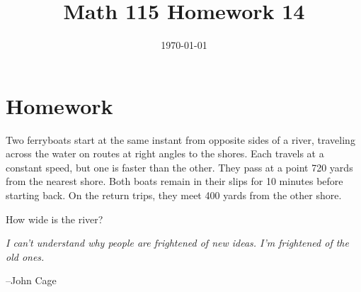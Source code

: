 \documentclass[fleqn,addpoints]{exam}
\title{Math 115 Homework 14}
\date{\today}
\begin{document}
\maketitle

\section{Homework}

\begin{questions}
\question
Two ferryboats start at the same instant from opposite sides of a river, traveling across the water on routes at right
angles to the shores.  Each travels at a constant speed, but one is faster than the other.  They pass at a point 720
yards from the nearest shore.  Both boats remain in their slips for 10 minutes before starting back.  On the return
trips, they meet 400 yards from the other shore.

How wide is the river?

\end{questions}

\ifprintanswers
\else

\vspace{4 in}

{\em I can't understand why people are frightened of new ideas. I'm frightened of the old ones.}

\vspace{.1 cm}
\hspace{1 cm} --John Cage
\fi
\end{document}
